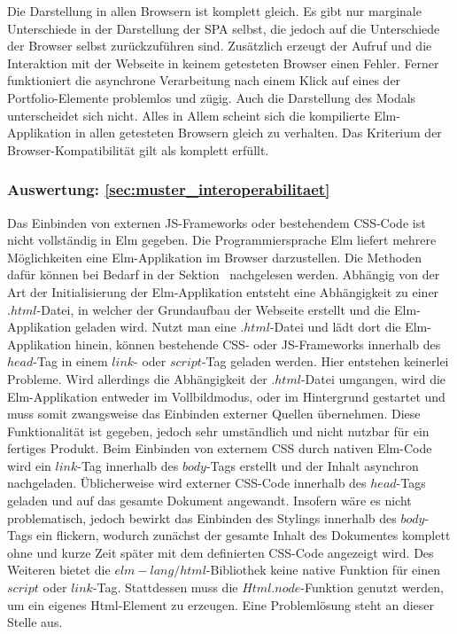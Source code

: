 Die Darstellung in allen Browsern ist komplett gleich. Es gibt nur marginale Unterschiede in der Darstellung der \ac{SPA} selbst, die jedoch auf die Unterschiede der Browser selbst zurückzuführen sind. Zusätzlich erzeugt der Aufruf und die Interaktion mit der Webseite in keinem getesteten Browser einen Fehler. Ferner funktioniert die asynchrone Verarbeitung nach einem Klick auf eines der Portfolio-Elemente problemlos und zügig. Auch die Darstellung des Modals unterscheidet sich nicht. Alles in Allem scheint sich die kompilierte Elm-Applikation in allen getesteten Browsern gleich zu verhalten. Das Kriterium der Browser-Kompatibilität gilt als komplett erfüllt.

\subsubsection{Auswertung: \ref{sec:muster_interoperabilitaet} }
Das Einbinden von externen \ac{JS}-Frameworks oder bestehendem \ac{CSS}-Code ist nicht vollständig in Elm gegeben. Die Programmiersprache Elm liefert mehrere Möglichkeiten eine Elm-Applikation im Browser darzustellen. Die Methoden dafür können bei Bedarf in der Sektion~ nachgelesen werden. Abhängig von der Art der Initialisierung der Elm-Applikation entsteht eine Abhängigkeit zu einer $.html$-Datei, in welcher der Grundaufbau der Webseite erstellt und die Elm-Applikation geladen wird. Nutzt man eine $.html$-Datei und lädt dort die Elm-Applikation hinein, können bestehende \ac{CSS}- oder \ac{JS}-Frameworks innerhalb des $head$-Tag in einem $link$- oder $script$-Tag geladen werden. Hier entstehen keinerlei Probleme. Wird allerdings die Abhängigkeit der $.html$-Datei umgangen, wird die Elm-Applikation entweder im Vollbildmodus, oder im Hintergrund gestartet und muss somit zwangsweise das Einbinden externer Quellen übernehmen. Diese Funktionalität ist gegeben, jedoch sehr umständlich und nicht nutzbar für ein fertiges Produkt. Beim Einbinden von externem \ac{CSS} durch nativen Elm-Code wird ein $link$-Tag innerhalb des $body$-Tags erstellt und der Inhalt asynchron nachgeladen. Üblicherweise wird externer \ac{CSS}-Code innerhalb des $head$-Tags geladen und auf das gesamte Dokument angewandt. Insofern wäre es nicht problematisch, jedoch bewirkt das Einbinden des Stylings innerhalb des $body$-Tags ein flickern, wodurch zunächst der gesamte Inhalt des Dokumentes komplett ohne und kurze Zeit später mit dem definierten \ac{CSS}-Code angezeigt wird. Des Weiteren bietet die $elm-lang/html$-Bibliothek keine native Funktion für einen $script$ oder $link$-Tag. Stattdessen muss die $Html.node$-Funktion genutzt werden, um ein eigenes Html-Element zu erzeugen. Eine Problemlösung steht an dieser Stelle aus.

